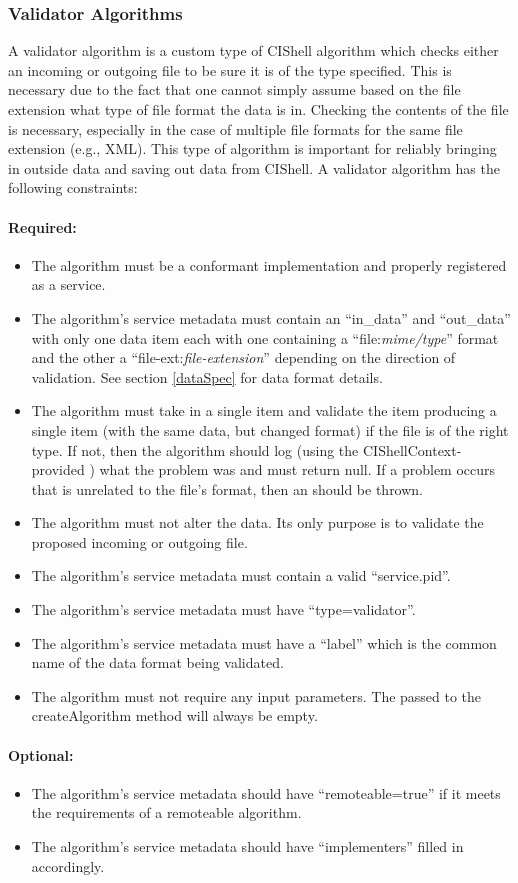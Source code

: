 \subsubsection{Validator Algorithms}

A validator algorithm is a custom type of CIShell algorithm which checks either
an incoming or outgoing file to be sure it is of the type specified. This is
necessary due to the fact that one cannot simply assume based on the file
extension what type of file format the data is in. Checking the contents of the
file is necessary, especially in the case of multiple file formats for the same
file extension (e.g., XML). This type of algorithm is important for reliably
bringing in outside data and saving out data from CIShell. A validator algorithm
has the following constraints:

\paragraph*{Required:}
\begin{itemize}
  \item The algorithm must be a conformant 
  implementation and properly registered as a service.
  \item The algorithm's service metadata must contain an ``in\_data''
  and ``out\_data'' with only one data item each with one containing a
  ``file:\textit{mime/type}'' format and the other a
  ``file-ext:\textit{file-extension}'' depending on the direction of
  validation. See section \ref{dataSpec} for data format details.
  \item The algorithm must take in a single  item and validate the
  item producing a single  item (with the same data, but changed
  format) if the file is of the right type. If not, then the algorithm should
  log (using the CIShellContext-provided ) what the problem
  was and must return null. If a problem occurs that is unrelated to the
  file's format, then an  should be thrown.
  \item The algorithm must not alter the data. Its only purpose is to validate
  the proposed incoming or outgoing file.
  \item The algorithm's service metadata must contain a valid ``service.pid''.
  \item The algorithm's service metadata must have ``type=validator''.
  \item The algorithm's service metadata must have a ``label'' which is the
  common name of the data format being validated.
  \item The algorithm must not require any input parameters. The
   passed to the createAlgorithm method will always be empty.
\end{itemize}

\paragraph*{Optional:}
\begin{itemize}
  \item The algorithm's service metadata should have ``remoteable=true'' if it
  meets the requirements of a remoteable algorithm.
  \item The algorithm's service metadata should have ``implementers'' filled
  in accordingly.
\end{itemize}

